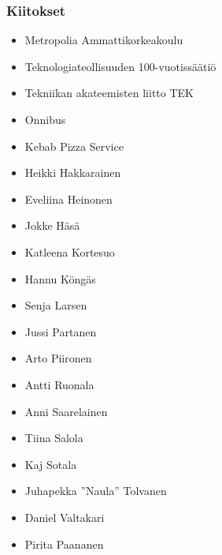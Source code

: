 \newpage

\subsubsection*{Kiitokset}
\begin{itemize}
\item Metropolia Ammattikorkeakoulu %
\item Teknologiateollisuuden 100-vuotissäätiö %
\item Tekniikan akateemisten liitto TEK
\item Onnibus
\item Kebab Pizza Service
\item Heikki Hakkarainen
\item Eveliina Heinonen
\item Jokke Häsä
\item Katleena Kortesuo
\item Hannu Köngäs
\item Senja Larsen
\item Jussi Partanen
\item Arto Piironen
\item Antti Ruonala
\item Anni Saarelainen
\item Tiina Salola
\item Kaj Sotala
\item Juhapekka ''Naula'' Tolvanen
\item Daniel Valtakari
\item Pirita Paananen %
\end{itemize}
